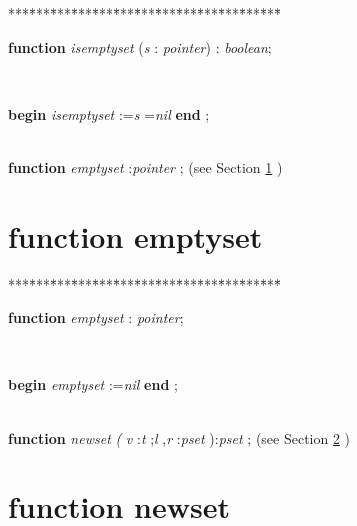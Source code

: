 \documentclass[10pt, a4paper]{article}
\begin{document}
\begin{tabbing}
***\=***\=***\=***\=***\=***\=***\=***\=***\=***\=***\=***\=***\=\kill
\parbox{14cm}{\textsf {\textbf {function } \textsf{\textit{isemptyset} (\textit{s} : \textit{pointer}) : \textit{boolean}}; }}\\
\parbox{14cm}{\textsf{\textbf{begin}  \textit{isemptyset} :=\textit{s} =\textit{nil}  \textbf{end} ;}}\\
\+\textsf{\textbf{function}  \textit{emptyset} :\textit{pointer} ;} (see Section \ref{sec:genericset/pointer2pset/setle/setge/setequals/setdifference/rec/setsymetricdifference/setintersection/rec/setunion/rec/isemptysetemptyset} )\\
\end{tabbing}
\section{function emptyset}\label{sec:genericset/pointer2pset/setle/setge/setequals/setdifference/rec/setsymetricdifference/setintersection/rec/setunion/rec/isemptysetemptyset}

\begin{tabbing}
***\=***\=***\=***\=***\=***\=***\=***\=***\=***\=***\=***\=***\=\kill
\parbox{14cm}{\textsf {\textbf {function } \textsf{\textit{emptyset} : \textit{pointer}}; }}\\
\parbox{14cm}{\textsf{\textbf{begin}  \textit{emptyset} :=\textit{nil}  \textbf{end} ;}}\\
\+\textsf{\textbf{function}  \textit{newset} \textit{(} \textit{v} :\textit{t} ;\textit{l} ,\textit{r} :\textit{pset} ):\textit{pset} ;} (see Section \ref{sec:genericset/pointer2pset/setle/setge/setequals/setdifference/rec/setsymetricdifference/setintersection/rec/setunion/rec/isemptyset/emptysetnewset} )\\
\end{tabbing}
\section{function newset}\label{sec:genericset/pointer2pset/setle/setge/setequals/setdifference/rec/setsymetricdifference/setintersection/rec/setunion/rec/isemptyset/emptysetnewset}
\end{document}
